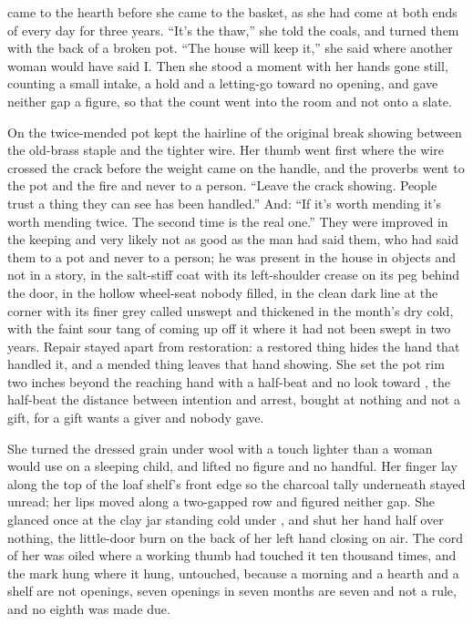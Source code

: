 \scenebreak

 came to the hearth before she came to the basket, as she had come at both ends of every day for three years. “It's the thaw,” she told the coals, and turned them with the back of a broken pot. “The house will keep it,” she said where another woman would have said I. Then she stood a moment with her hands gone still, counting a small intake, a hold and a letting-go toward no opening, and gave neither gap a figure, so that the count went into the room and not onto a slate.

On  the twice-mended pot kept the hairline of the original break showing between the old-brass staple and the tighter wire. Her thumb went first where the wire crossed the crack before the weight came on the handle, and the proverbs went to the pot and the fire and never to a person. “Leave the crack showing. People trust a thing they can see has been handled.” And: “If it's worth mending it's worth mending twice. The second time is the real one.” They were improved in the keeping and very likely not as good as the man had said them, who had said them to a pot and never to a person; he was present in the house in objects and not in a story, in the salt-stiff coat with its left-shoulder crease on its peg behind the door, in the hollow wheel-seat nobody filled, in the clean dark line at the corner with its finer grey called  unswept and thickened in the month's dry cold, with the faint sour tang of  coming up off it where it had not been swept in two years. Repair stayed apart from restoration: a restored thing hides the hand that handled it, and a mended thing leaves that hand showing. She set the pot rim two inches beyond the reaching hand with a half-beat and no look toward , the half-beat the distance between intention and arrest, bought at nothing and not a gift, for a gift wants a giver and nobody gave.

She turned the dressed grain under wool with a touch lighter than a woman would use on a sleeping child, and lifted no figure and no handful. Her finger lay along the top of the loaf shelf's front edge so the charcoal tally underneath stayed unread; her lips moved along a two-gapped row and figured neither gap. She glanced once at the clay jar standing cold under , and shut her hand half over nothing, the little-door burn on the back of her left hand closing on air. The cord of her  was oiled where a working thumb had touched it ten thousand times, and the mark hung where it hung, untouched, because a morning and a hearth and a shelf are not openings, seven openings in seven months are seven and not a rule, and no eighth was made due.

